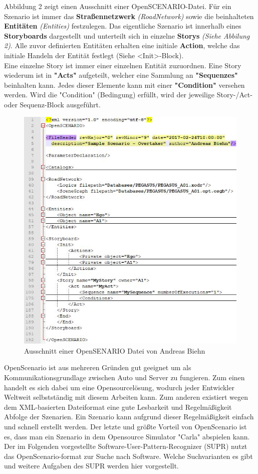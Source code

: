 Abbildung 2 zeigt einen Ausschnitt einer OpenSCENARIO-Datei. Für ein Szenario ist immer das \textbf{Straßennetzwerk}\textit{ (RoadNetwork) }sowie die beinhalteten \textbf{Entitäten }\textit{(Entities)} festzulegen. Das eigentliche Szenario ist innerhalb eines \textbf{Storyboards }dargestellt und unterteilt sich in einzelne \textbf{Storys }\textit{(Siehe Abbilung 2)}. Alle zuvor definierten Entitäten erhalten eine initiale \textbf{Action}, welche das initiale Handeln der Entität festlegt (Siehe <Init>-Block).\\
Eine einzelne Story ist immer einer einzelnen Entität zuzuordnen. Eine Story wiederum ist in \textbf{"Acts"} aufgeteilt, welcher eine Sammlung an \textbf{"Sequenzes"} beinhalten kann. Jedes dieser Elemente kann mit einer \textbf{"Condition"} versehen werden. Wird die "Condition" (Bedingung) erfüllt, wird der jeweilige Story-/Act- oder Sequenz-Block ausgeführt.
\begin{figure}[H]
	\includegraphics[width=\textwidth]{../pictures/openscenario.jpg}
	\caption{Ausschnitt einer OpenSENARIO Datei von Andreas Biehn\cite[(Downloads)]{b35}}
\end{figure}
OpenScenario ist aus mehreren Gründen gut geeignet um als Kommunikationsgrundlage zwischen Auto und Server zu fungieren. Zum einen handelt es sich dabei um eine Opensourcelösung, wodurch jeder Entwickler Weltweit selbstständig mit diesem Arbeiten kann. Zum anderen existiert wegen dem XML-basierten Dateiformat eine gute Lesbarkeit und Regelmäßigkeit Abfolge der Szenarien. Ein Szenario kann aufgrund dieser Regelmäßigkeit einfach und schnell erstellt werden. Der letzte und größte Vorteil von OpenScenario ist es, dass man ein Szenario in dem Opensource Simulator "Carla" abspielen kann.\\
Der im Folgenden vorgestellte Software-User-Pattern-Recognizer (SUPR) nutzt das OpenScenario-format zur Suche nach Software. Welche Suchvarianten es gibt und weitere Aufgaben des SUPR werden hier vorgestellt.

